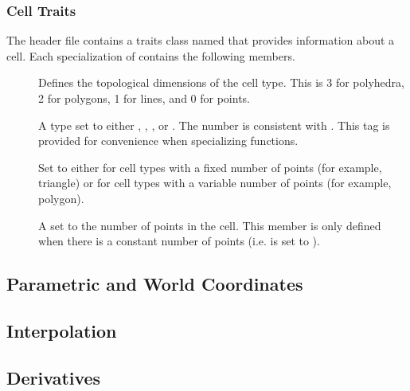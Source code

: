 

\subsubsection{Cell Traits}


The  header file contains a traits class
named  that provides information about a cell. Each
specialization of  contains the following
members.

\begin{description}
\item[] Defines the topological
  dimensions of the cell type. This is 3 for polyhedra, 2 for polygons, 1
  for lines, and 0 for points.
\item[] A type set to either
  ,
  ,
  , or
  . The number
  is consistent with . This tag is
  provided for convenience when specializing functions.
\item[] Set to either 
  for cell types with a fixed number of points (for example, triangle) or
   for cell types with a variable number of
  points (for example, polygon).
\item[] A  set to the number of
  points in the cell. This member is only defined when there is a constant
  number of points (i.e.  is set to
  ).
\end{description}




\subsection{Parametric and World Coordinates}

\subsection{Interpolation}

\subsection{Derivatives}
